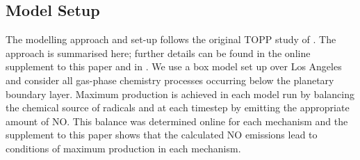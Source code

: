 \subsection{Model Setup} \label{ss:model_setup}
%
The modelling approach and set-up follows the original TOPP study of \citet{Butler:2011}.
The approach is summarised here; further details can be found in the online supplement to this paper and in \citet{Butler:2011}. 
We use a box model set up over Los Angeles and consider all gas-phase chemistry processes occurring below the planetary boundary layer.
Maximum  production is achieved in each model run by balancing the chemical source of radicals and  at each timestep by emitting the appropriate amount of NO.
This balance was determined online for each mechanism and the supplement to this paper shows that the calculated NO emissions lead to conditions of maximum  production in each mechanism.

